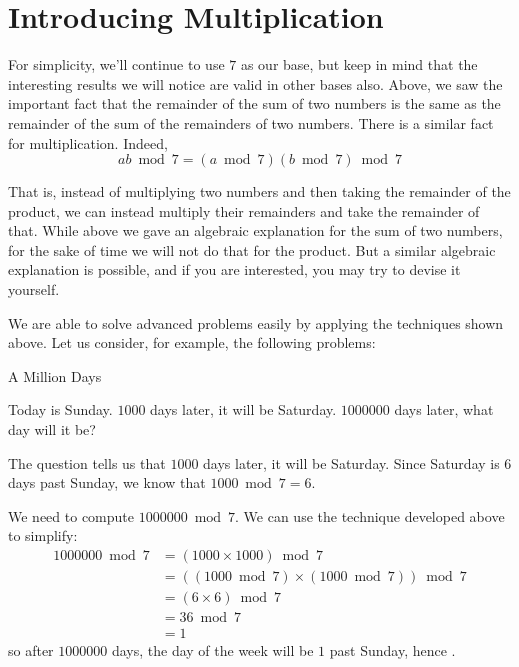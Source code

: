 \documentclass[a4paper,10pt]{report}
\begin{document}
\section{Introducing Multiplication}

For simplicity, we'll continue to use \(7\) as our base, but keep in mind that
the interesting results we will notice are valid in other bases also. Above, we
saw the important fact that the remainder of the sum of two numbers is the same
as the remainder of the sum of the remainders of two numbers. There is a
similar fact for multiplication. Indeed, \[ ab \bmod 7 = (a \bmod 7)(b \bmod 7)
\bmod 7 \]

That is, instead of multiplying two numbers and then taking the remainder of
the product, we can instead multiply their remainders and take the remainder of
that. While above we gave an algebraic explanation for the sum of two numbers,
for the sake of time we will not do that for the product. But a similar
algebraic explanation is possible, and if you are interested, you may try to
devise it yourself.

We are able to solve advanced problems easily by applying the techniques shown
above. Let us consider, for example, the following problems:

\begin{problem}{A Million Days}

 Today is Sunday. \(1000\) days later, it will be Saturday. \(1000000\) days
 later, what day will it be?

 \begin{solution}

  The question tells us that \(1000\) days later, it will be Saturday. Since
  Saturday is \(6\) days past Sunday, we know that \(1000 \bmod 7 = 6\).

  We need to compute \(1000000 \bmod 7\). We can use the technique developed
  above to simplify: \begin{align*}
   1000000 \bmod 7
   &= (1000 \times 1000) \bmod 7 \\
   &= ((1000 \bmod 7) \times (1000 \bmod 7)) \bmod 7 \\
   &= (6 \times 6) \bmod 7 \\
   &= 36 \bmod 7 \\
   &= 1
  \end{align*}
  so after \(1000000\) days, the day of the week will be \(1\) past Sunday,
  hence .

 \end{solution}
\end{problem}
\end{document}
